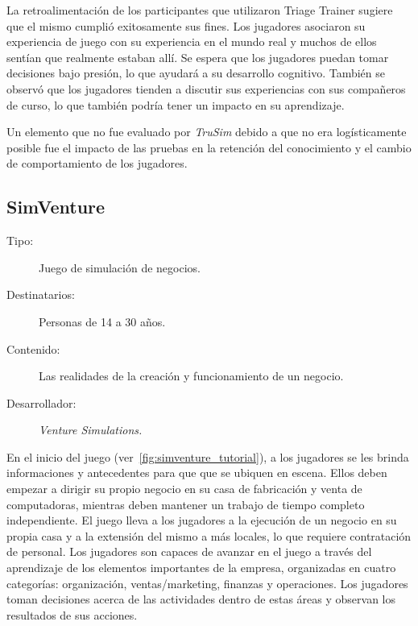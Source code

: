 La retroalimentación de los participantes que utilizaron Triage Trainer sugiere
que el mismo cumplió exitosamente sus fines. Los jugadores asociaron su
experiencia de juego con su experiencia en el mundo real y muchos de ellos
sentían que realmente estaban allí. Se espera que los jugadores puedan tomar
decisiones bajo presión, lo que ayudará a su desarrollo cognitivo. También se
observó que los jugadores tienden a discutir sus experiencias con sus compañeros
de curso, lo que también podría tener un impacto en su aprendizaje.

Un elemento que no fue evaluado por \emph{TruSim} debido a que no era
logísticamente posible fue el impacto de las pruebas en la retención del
conocimiento y el cambio de comportamiento de los
jugadores\cite{education:games}. 


\subsection{SimVenture}

\begin{description}
\item[Tipo:] Juego de simulación de negocios.
\item[Destinatarios:] Personas de 14 a 30 años.
\item[Contenido:] Las realidades de la creación y funcionamiento de un negocio.
\item[Desarrollador:] \emph{Venture Simulations.}
\end{description}

En el inicio del juego (ver~\ref{fig:simventure_tutorial}), a los jugadores se
les brinda informaciones y antecedentes para que que se ubiquen en escena. Ellos
deben empezar a dirigir su propio negocio en su casa de fabricación y venta de
computadoras, mientras deben mantener un trabajo de tiempo completo
independiente. El juego lleva a los jugadores a la ejecución de un negocio en su
propia casa y a la extensión del mismo a más locales, lo que requiere
contratación de personal. Los jugadores son capaces de avanzar en el juego a
través del aprendizaje de los elementos importantes de la empresa, organizadas
en cuatro categorías: organización, ventas/marketing, finanzas y operaciones.
Los jugadores toman decisiones acerca de las actividades dentro de estas áreas y
observan los resultados de sus acciones. 

